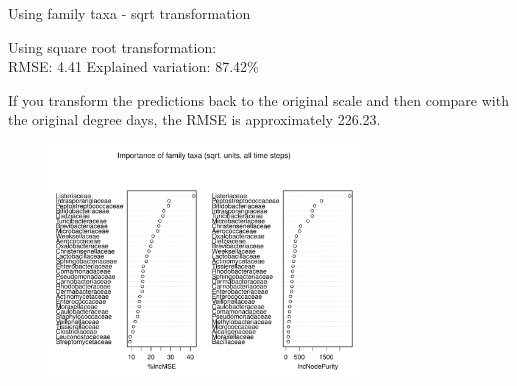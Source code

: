 \documentclass{beamer}
\begin{document}
\begin{frame}{Using family taxa - sqrt transformation}

  {\scriptsize
    
  \noindent Using square root transformation:\\
  RMSE: 4.41  \hspace{0.05in}  Explained variation: 87.42\%

  \vspace{0.05in}
  
  \noindent If you transform the predictions back to the original
  scale and then compare with the original degree days, the RMSE is
  approximately 226.23.
  
\begin{center}
\begin{figure}
  \includegraphics[width=3.25in]{../only_families/all_time_steps/sqrt_units_all_data_families_imp_plot}
\end{figure}
\end{center}
\vspace{-0.25in}
}
  
\end{frame}
\end{document}
